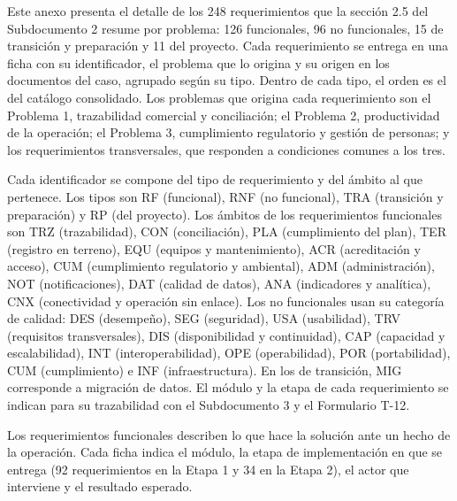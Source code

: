 \documentclass[anexo]{../../comun/overfore}
\begin{document}
Este anexo presenta el detalle de los 248 requerimientos que la sección 2.5 del Subdocumento 2 resume por problema: 126 funcionales, 96 no funcionales, 15 de transición y preparación y 11 del proyecto. Cada requerimiento se entrega en una ficha con su identificador, el problema que lo origina y su origen en los documentos del caso, agrupado según su tipo. Dentro de cada tipo, el orden es el del catálogo consolidado. Los problemas que origina cada requerimiento son el Problema 1, trazabilidad comercial y conciliación; el Problema 2, productividad de la operación; el Problema 3, cumplimiento regulatorio y gestión de personas; y los requerimientos transversales, que responden a condiciones comunes a los tres.

Cada identificador se compone del tipo de requerimiento y del ámbito al que pertenece. Los tipos son RF (funcional), RNF (no funcional), TRA (transición y preparación) y RP (del proyecto). Los ámbitos de los requerimientos funcionales son TRZ (trazabilidad), CON (conciliación), PLA (cumplimiento del plan), TER (registro en terreno), EQU (equipos y mantenimiento), ACR (acreditación y acceso), CUM (cumplimiento regulatorio y ambiental), ADM (administración), NOT (notificaciones), DAT (calidad de datos), ANA (indicadores y analítica), CNX (conectividad y operación sin enlace). Los no funcionales usan su categoría de calidad: DES (desempeño), SEG (seguridad), USA (usabilidad), TRV (requisitos transversales), DIS (disponibilidad y continuidad), CAP (capacidad y escalabilidad), INT (interoperabilidad), OPE (operabilidad), POR (portabilidad), CUM (cumplimiento) e INF (infraestructura). En los de transición, MIG corresponde a migración de datos. El módulo y la etapa de cada requerimiento se indican para su trazabilidad con el Subdocumento 3 y el Formulario T-12.

Los requerimientos funcionales describen lo que hace la solución ante un hecho de la operación. Cada ficha indica el módulo, la etapa de implementación en que se entrega (92 requerimientos en la Etapa 1 y 34 en la Etapa 2), el actor que interviene y el resultado esperado.
\end{document}
